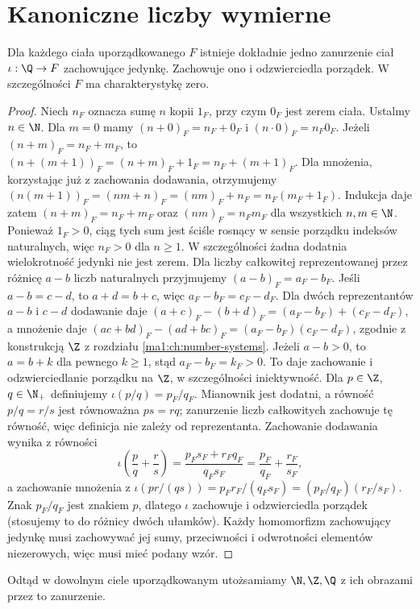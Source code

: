 \section{Kanoniczne liczby wymierne}
\begin{twierdzenie}
\label{ma1:thm:rational-embedding}
Dla każdego ciała uporządkowanego $F$ istnieje dokładnie jedno zanurzenie ciał $\iota:\Q\to F$ zachowujące jedynkę. Zachowuje ono i odzwierciedla porządek. W szczególności $F$ ma charakterystykę zero.
\end{twierdzenie}
\begin{proof}
Niech $n_F$ oznacza sumę $n$ kopii $1_F$, przy czym $0_F$ jest zerem ciała. Ustalmy $n\in\N$. Dla $m=0$ mamy $(n+0)_F=n_F+0_F$ i $(n\cdot0)_F=n_F0_F$. Jeżeli $(n+m)_F=n_F+m_F$, to $(n+(m+1))_F=(n+m)_F+1_F=n_F+(m+1)_F$. Dla mnożenia, korzystając już z zachowania dodawania, otrzymujemy $(n(m+1))_F=(nm+n)_F=(nm)_F+n_F=n_F(m_F+1_F)$. Indukcja daje zatem $(n+m)_F=n_F+m_F$ oraz $(nm)_F=n_Fm_F$ dla wszystkich $n,m\in\N$. Ponieważ $1_F>0$, ciąg tych sum jest ściśle rosnący w sensie porządku indeksów naturalnych, więc $n_F>0$ dla $n\ge1$. W szczególności żadna dodatnia wielokrotność jedynki nie jest zerem.
Dla liczby całkowitej reprezentowanej przez różnicę $a-b$ liczb naturalnych przyjmujemy $(a-b)_F=a_F-b_F$. Jeśli $a-b=c-d$, to $a+d=b+c$, więc $a_F-b_F=c_F-d_F$. Dla dwóch reprezentantów $a-b$ i $c-d$ dodawanie daje $(a+c)_F-(b+d)_F=(a_F-b_F)+(c_F-d_F)$, a mnożenie daje $(ac+bd)_F-(ad+bc)_F=(a_F-b_F)(c_F-d_F)$, zgodnie z konstrukcją $\Z$ z rozdziału \ref{ma1:ch:number-systems}. Jeżeli $a-b>0$, to $a=b+k$ dla pewnego $k\ge1$, stąd $a_F-b_F=k_F>0$. To daje zachowanie i odzwierciedlanie porządku na $\Z$, w szczególności iniektywność.
Dla $p\in\Z$, $q\in\N_+$ definiujemy $\iota(p/q)=p_F/q_F$. Mianownik jest dodatni, a równość $p/q=r/s$ jest równoważna $ps=rq$; zanurzenie liczb całkowitych zachowuje tę równość, więc definicja nie zależy od reprezentanta. Zachowanie dodawania wynika z równości
\[
 \iota\left(\frac pq+\frac rs\right)
 =\frac{p_Fs_F+r_Fq_F}{q_Fs_F}
 =\frac{p_F}{q_F}+\frac{r_F}{s_F},
\]
a zachowanie mnożenia z $\iota(pr/(qs))=p_Fr_F/(q_Fs_F)=(p_F/q_F)(r_F/s_F)$. Znak $p_F/q_F$ jest znakiem $p$, dlatego $\iota$ zachowuje i odzwierciedla porządek (stosujemy to do różnicy dwóch ułamków). Każdy homomorfizm zachowujący jedynkę musi zachowywać jej sumy, przeciwności i odwrotności elementów niezerowych, więc musi mieć podany wzór.
\end{proof}
Odtąd w dowolnym ciele uporządkowanym utożsamiamy $\N,\Z,\Q$ z ich obrazami przez to zanurzenie.

